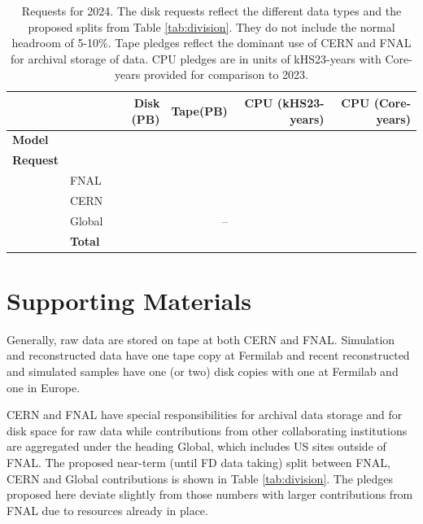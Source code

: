 \documentclass[12pt]{article}
\begin{document}
\begin{table}[h]
\begin{centering}

\begin{tabular}{|llr|r|r|r|}
\hline
 	&&	Disk (PB)	&		Tape(PB)	&	CPU (kHS23-years)	 & CPU (Core-years)\\
	\hline
{\bf Model}	&&	\DISKTotal	&		\TAPETotal	&	\CPUTotal	& \CORESTotal\\
\hline
{\bf Request}	&&		 		&		&		\\
&FNAL	&	\DISKFNAL&	 	\TAPEFNAL	&	\CPUFNAL & \CORESFNAL	\\
&CERN	&	\DISKCERN	&	 	\TAPECERN&	\CPUCERN & \CORESCERN	\\
&Global	&	\DISKGlobal	&	 	--	&	\CPUGlobal   &\CORESGlobal\\
\hline
&{\bf Total}	&	\DISKTotal	&	 	\TAPETotal	&	\CPUTotal	 & \CORESTotal\\
\hline
\end{tabular}

\caption{Requests for 2024.  The disk requests reflect the different data types and the proposed splits from Table \ref{tab:division}.  They do not include the normal headroom of 5-10\%.  Tape pledges reflect the dominant use of CERN and FNAL for archival storage of data.  CPU pledges are in units of kHS23-years with Core-years provided for comparison to 2023.    }\label{tab:summary2024}
\end{centering}

\end{table}



\clearpage

\section{Supporting Materials}

Generally, raw data are stored on tape at both CERN and FNAL.  Simulation and reconstructed data  have one tape copy at Fermilab and recent reconstructed and simulated samples have one (or two) disk copies with one at Fermilab and one in Europe.  %

CERN and FNAL have special responsibilities for archival data storage and for disk space for raw data while contributions from  other collaborating institutions are aggregated under the heading Global, which includes US sites outside of FNAL.  The proposed near-term  (until FD data taking) split between FNAL, CERN and Global contributions  is shown in Table \ref{tab:division}.  The pledges proposed here deviate slightly from those numbers with larger contributions from FNAL due to resources already in place. 
\end{document}
